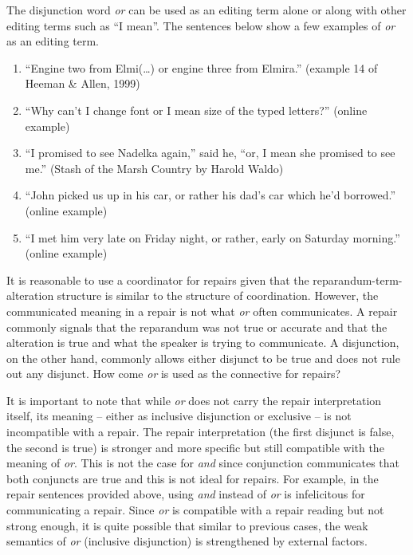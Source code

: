 \documentclass[oneside]{report}
\theoremstyle{definition}
\theoremstyle{definition}
\theoremstyle{definition}
\theoremstyle{remark}
\begin{document}
The disjunction word \emph{or} can be used as an editing term alone or
along with other editing terms such as ``I mean''. The sentences below
show a few examples of \emph{or} as an editing term.
\begin{enumerate}
\def\labelenumi{(\arabic{enumi})}
\setcounter{enumi}{9}
\tightlist
\item
  ``Engine two from Elmi(\ldots{}) or engine three from Elmira.''
  (example 14 of Heeman \& Allen, 1999)
\item
  ``Why can't I change font or I mean size of the typed letters?''
  (online example)
\item
  ``I promised to see Nadelka again,'' said he, ``or, I mean she
  promised to see me.'' (Stash of the Marsh Country by Harold Waldo)
\item
  ``John picked us up in his car, or rather his dad's car which he'd
  borrowed.'' (online example)
\item
  ``I met him very late on Friday night, or rather, early on Saturday
  morning.'' (online example)
\end{enumerate}
It is reasonable to use a coordinator for repairs given that the
reparandum-term-alteration structure is similar to the structure of
coordination. However, the communicated meaning in a repair is not what
\emph{or} often communicates. A repair commonly signals that the
reparandum was not true or accurate and that the alteration is true and
what the speaker is trying to communicate. A disjunction, on the other
hand, commonly allows either disjunct to be true and does not rule out
any disjunct. How come \emph{or} is used as the connective for repairs?

It is important to note that while \emph{or} does not carry the repair
interpretation itself, its meaning -- either as inclusive disjunction or
exclusive -- is not incompatible with a repair. The repair
interpretation (the first disjunct is false, the second is true) is
stronger and more specific but still compatible with the meaning of
\emph{or}. This is not the case for \emph{and} since conjunction
communicates that both conjuncts are true and this is not ideal for
repairs. For example, in the repair sentences provided above, using
\emph{and} instead of \emph{or} is infelicitous for communicating a
repair. Since \emph{or} is compatible with a repair reading but not
strong enough, it is quite possible that similar to previous cases, the
weak semantics of \emph{or} (inclusive disjunction) is strengthened by
external factors.
\end{document}

